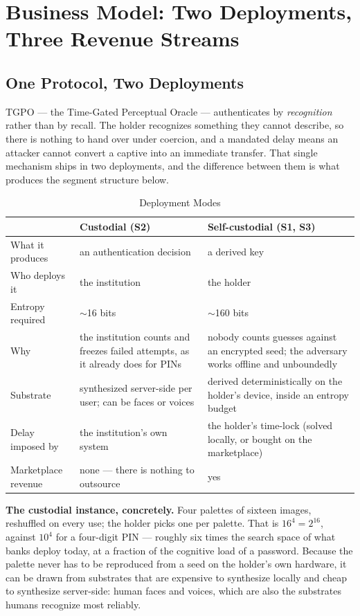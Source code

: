 
\section{Business Model: Two Deployments, Three Revenue Streams}

\subsection{One Protocol, Two Deployments}\label{sec:deployments}

TGPO --- the Time-Gated Perceptual Oracle --- authenticates by \emph{recognition}
rather than by recall. The holder recognizes something they cannot describe, so
there is nothing to hand over under coercion, and a mandated delay means an
attacker cannot convert a captive into an immediate transfer. That single
mechanism ships in two deployments, and the difference between them is what
produces the segment structure below.

\begin{table}[H]
\centering
\caption{Deployment Modes}
\begin{tabularx}{\linewidth}{l X X}
\toprule
 & \textbf{Custodial} (S2) & \textbf{Self-custodial} (S1, S3) \\\midrule
What it produces & an authentication decision & a derived key \\
Who deploys it & the institution & the holder \\
Entropy required & $\sim$16 bits & $\sim$160 bits \\
Why & the institution counts and freezes failed attempts, as it already does for PINs & nobody counts guesses against an encrypted seed; the adversary works offline and unboundedly \\
Substrate & synthesized server-side per user; can be faces or voices & derived deterministically on the holder's device, inside an entropy budget \\
Delay imposed by & the institution's own system & the holder's time-lock (solved locally, or bought on the marketplace) \\
Marketplace revenue & none --- there is nothing to outsource & yes \\
\bottomrule
\end{tabularx}
\end{table}

\noindent\textbf{The custodial instance, concretely.} Four palettes of sixteen
images, reshuffled on every use; the holder picks one per palette. That is
$16^4 = 2^{16}$, against $10^4$ for a four-digit PIN --- roughly six times the
search space of what banks deploy today, at a fraction of the cognitive load of a
password. Because the palette never has to be reproduced from a seed on the
holder's own hardware, it can be drawn from substrates that are expensive to
synthesize locally and cheap to synthesize server-side: human faces and voices,
which are also the substrates humans recognize most reliably.

